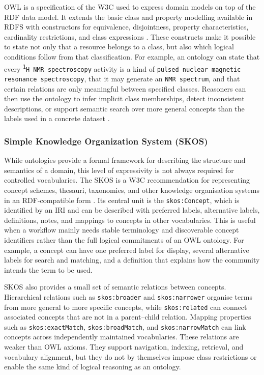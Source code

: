 \ac{OWL} is a specification of the \ac{W3C} used to express domain models on top of the \ac{RDF} data model.
It extends the basic class and property modelling available in \ac{RDFS} with constructors for equivalence, disjointness, property characteristics, cardinality restrictions, and class expressions \cite{w3c2012owl2primer,w3c2014rdfschema}.
These constructs make it possible to state not only that a resource belongs to a class, but also which logical conditions follow from that classification.
For example, an ontology can state that every \texttt{\textsuperscript{1}H NMR spectroscopy} activity is a kind of \texttt{pulsed nuclear magnetic resonance spectroscopy}, that it may generate an \texttt{NMR spectrum}, and that certain relations are only meaningful between specified classes.
Reasoners can then use the ontology to infer implicit class memberships, detect inconsistent descriptions, or support semantic search over more general concepts than the labels used in a concrete dataset \cite{guarino1998formal,w3c2012owl2primer}.

\subsubsection{Simple Knowledge Organization System (SKOS)}
\label{sec:skos}
While ontologies provide a formal framework for describing the structure and semantics of a domain, this level of expressivity is not always required for controlled vocabularies.
The \ac{SKOS} is a \ac{W3C} recommendation for representing concept schemes, thesauri, taxonomies, and other knowledge organisation systems in an \ac{RDF}-compatible form \cite{w3c2009skos}.
Its central unit is the \texttt{skos:Concept}, which is identified by an \ac{IRI} and can be described with preferred labels, alternative labels, definitions, notes, and mappings to concepts in other vocabularies.
This is useful when a workflow mainly needs stable terminology and discoverable concept identifiers rather than the full logical commitments of an \ac{OWL} ontology.
For example, a concept can have one preferred label for display, several alternative labels for search and matching, and a definition that explains how the community intends the term to be used.

\ac{SKOS} also provides a small set of semantic relations between concepts.
Hierarchical relations such as \texttt{skos:broader} and \texttt{skos:narrower} organise terms from more general to more specific concepts, while \texttt{skos:related} can connect associated concepts that are not in a parent--child relation.
Mapping properties such as \texttt{skos:exactMatch}, \texttt{skos:broadMatch}, and \texttt{skos:narrowMatch} can link concepts across independently maintained vocabularies.
These relations are weaker than \ac{OWL} axioms.
They support navigation, indexing, retrieval, and vocabulary alignment, but they do not by themselves impose class restrictions or enable the same kind of logical reasoning as an ontology.


